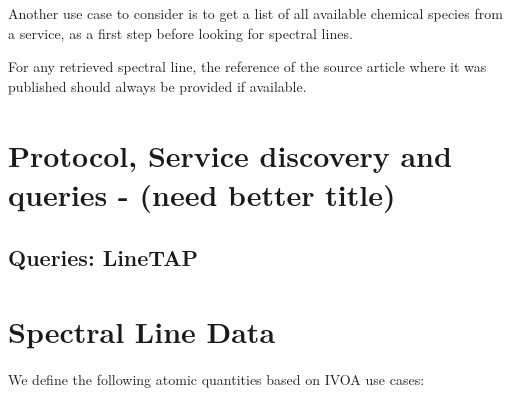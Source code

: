 \documentclass[11pt,a4paper]{ivoa}
\begin{document}
Another use case to consider is to get a list of all available chemical
species 
from a service, as a first step before looking for spectral lines.

For any retrieved spectral line, the reference of the source article
where it was published
should always be provided if available.

\section{Protocol, Service discovery and queries - (need better title)}

\subsection{ Queries: LineTAP }


\section{Spectral Line Data}\label{quantities}

We define the following atomic quantities based on IVOA use cases:
\end{document}
